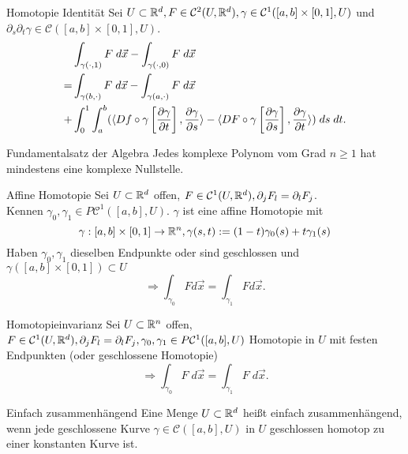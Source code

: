 \documentclass[main.tex]{subfiles}
\begin{document}
\begin{karte}{Homotopie Identität}
    Sei \( U \subset \mathbb{R}^d, F \in \mathcal{C}^2(U, \mathbb{R}^d), 
    \gamma \in \mathcal{C}^1([a,b] \times [0,1], U) \) und 
    \( \partial_s \partial_t \gamma \in \mathcal{C}([a,b] \times [0,1], U) \).
    \begin{align*}
        &\int_{\gamma(\cdot, 1)} F \; d \vec{x}
        - \int_{\gamma(\cdot, 0)} F \; d\vec{x} \\
        = &\int_{\gamma(b, \cdot)} F \; d \vec{x} 
        - \int_{\gamma(a, \cdot)} F \; d\vec{x} \\
        + &\int_0^1 \int_a^b (\langle Df \circ \gamma
        \left[\frac{\partial\gamma}{\partial t}\right] ,  \frac{\partial\gamma}{\partial s}  \rangle 
        - \langle  DF \circ \gamma 
        \left[\frac{\partial\gamma}{\partial s}\right] ,  \frac{\partial\gamma}{\partial t}  \rangle ) 
        \; ds\; dt.
    \end{align*}
\end{karte}

\begin{karte}{Fundamentalsatz der Algebra}
    Jedes komplexe Polynom vom Grad \( n \geq 1 \) hat 
    mindestens eine komplexe Nullstelle.
\end{karte}

\begin{karte}{Affine Homotopie}
    Sei \(U \subset \mathbb{R}^d \) offen, \( F \in \mathcal{C}^1(U, \mathbb{R}^d), 
    \partial_j F_l = \partial_l F_j \).\\
    Kennen \( \gamma_0, \gamma_1 \in P\mathcal{C}^1([a,b], U) \).
    \(\gamma \) ist eine affine Homotopie mit 
    \[ \gamma : [a,b] \times [0,1] \rightarrow \mathbb{R}^n, \gamma(s,t) 
    := (1-t)\gamma_0(s) + t \gamma_1(s) \]
    Haben \(\gamma_0,\gamma_1\) dieselben 
    Endpunkte oder sind geschlossen und 
    \(\gamma([a,b]\times[0,1]) \subset U \)
    \[ \Rightarrow \int_{\gamma_0} F d\vec{x} 
    = \int_{\gamma_1} F d\vec{x}. \]
\end{karte}

\begin{karte}{Homotopieinvarianz}
    Sei \( U \subset \mathbb{R}^n \) offen, 
    \( F \in \mathcal{C}^1(U, \mathbb{R}^d), 
    \partial_j F_l = \partial_l F_j, 
    \gamma_0, \gamma_1 \in P\mathcal{C}^1([a,b], U) \)
    Homotopie in \( U \) mit festen 
    Endpunkten (oder geschlossene Homotopie)
    \[ \Rightarrow \int_{\gamma_0} F \; d\vec{x} 
    = \int_{\gamma_1} F \; d\vec{x}. \]
\end{karte}

\begin{karte}{Einfach zusammenhängend}
    Eine Menge \(U \subset \mathbb{R}^d\) heißt einfach zusammenhängend, wenn jede
    geschlossene Kurve \(\gamma \in \mathcal{C}([a,b], U)\) in \(U\)
    geschlossen homotop zu einer konstanten Kurve ist.
\end{karte}
\end{document}
